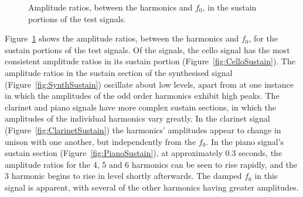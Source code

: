 \begin{figure}[h!]
			\quad
			\caption{Amplitude ratios, between the harmonics and $f_{0}$, in the sustain
				 portions of the test signals.}
			\label{fig:SustainAmplitudes}
		\end{figure}

		Figure~\ref{fig:SustainAmplitudes} shows the amplitude ratios, between the harmonics and $f_{0}$, for the
		sustain portions of the test signals. Of the signals, the cello signal has the most consistent amplitude
		ratios in its sustain portion (Figure~\ref{fig:CelloSustain}). The amplitude ratios in the sustain section
		of the synthesised signal (Figure~\ref{fig:SynthSustain}) oscillate about low levels, apart from at one
		instance in which the amplitudes of the odd order harmonics exhibit high peaks. The clarinet and piano
		signals have more complex sustain sections, in which the amplitudes of the individual harmonics vary
		greatly. In the clarinet signal (Figure~\ref{fig:ClarinetSustain}) the harmonics' amplitudes appear to
		change in unison with one another, but independently from the $f_{0}$. In the piano signal's sustain
		section (Figure~\ref{fig:PianoSustain}), at approximately 0.3 seconds, the amplitude ratios for the
		4, 5 and 6 harmonics can be seen to rise rapidly, and the 3
		harmonic begins to rise in level shortly afterwards. The damped $f_{0}$ in this signal is apparent, with
		several of the other harmonics having greater amplitudes.

